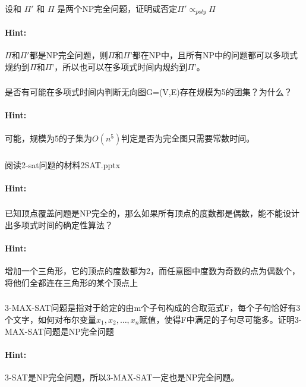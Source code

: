 \documentclass{article}
\begin{document}
     \subsubsection{}设和 $\Pi'$ 和 $\Pi$
     是两个NP完全问题，证明或否定$\Pi' \propto _{poly} \Pi$
     \paragraph{Hint:}$\Pi$和$\Pi'$都是NP完全问题，则$\Pi$和$\Pi$’都在NP中，且所有NP中的问题都可以多项式规约到$\Pi$和$\Pi$’，所以也可以在多项式时间内规约到$\Pi$’。
     
     \subsubsection{}是否有可能在多项式时间内判断无向图G=(V,E)存在规模为5的团集？为什么？
     \paragraph{Hint:}可能，规模为5的子集为$O(n^5)$判定是否为完全图只需要常数时间。
     
     \subsubsection{}阅读2-sat问题的材料2SAT.pptx
     \paragraph{Hint:}
     
     \subsubsection{}已知顶点覆盖问题是NP完全的，那么如果所有顶点的度数都是偶数，能不能设计出多项式时间的确定性算法？
     \paragraph{Hint:}增加一个三角形，它的顶点的度数都为2，而任意图中度数为奇数的点为偶数个，将他们全都连在三角形的某个顶点上
     
      \subsubsection{}3-MAX-SAT问题是指对于给定的由m个子句构成的合取范式F，每个子句恰好有3个文字，如何对布尔变量$x_1,x_2,…,x_n$赋值，使得F中满足的子句尽可能多。证明3-MAX-SAT问题是NP完全问题
     \paragraph{Hint:}3-SAT是NP完全问题，所以3-MAX-SAT一定也是NP完全问题。
     
\end{document}
